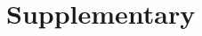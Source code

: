 \documentclass[pre,twocolumn,twoside,showpacs,byrevtex,superscriptaddress]{revtex4}
\begin{document}
\title{
  
}



\date{\today}

  

\maketitle












\appendix

\section{Supplementary}


\end{document}
